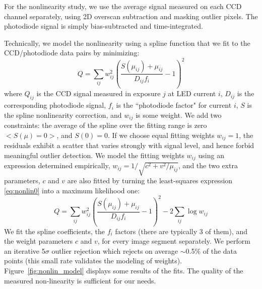 For the nonlinearity study, we use the average signal measured on each CCD channel separately, using 2D overscan subtraction and masking outlier pixels. The photodiode signal is simply bias-subtracted and time-integrated. 

Technically, we model the nonlinearity using a spline function that we fit to the CCD/photodiode data pairs by minimizing:
\begin{equation}
Q = \sum_{ij} w_{ij}^2 \left( \frac{ S(\mu_{ij}) +\mu_{ij}  }{D_{ij} f_i} -1 \right)^2
\label{eq:nonlin0}
\end{equation}
where $Q_{ij}$ is the CCD signal measured in exposure $j$ at LED current $i$,
$D_{ij}$ is the corresponding photodiode signal, $f_i$ is the ``photodiode factor" for current $i$, $S$ is the spline nonlinearity correction, and $w_{ij}$ is some weight. We add two constraints: the average of the spline over the fitting range is zero $<S(\mu)=0>$, and $S(0) = 0$. If we choose equal fitting weights $w_{ij}=1$, the residuals exhibit a scatter that varies strongly with signal level, and hence forbid meaningful outlier detection. We model the fitting weights $w_{ij}$ using an expression determined empirically, $w_{ij} = 1/\sqrt{c^2+v^2/\mu_{ij}}$, and the two extra parameters, $c$ and $v$ are also fitted by turning the least-squares expression \ref{eq:nonlin0} into a maximum likelihood one:
\begin{equation}
Q = \sum_{ij} w_{ij}^2 \left( \frac{ S(\mu_{ij}) +\mu_{ij}  }{D_{ij} f_i} -1 \right)^2 - 2 \sum_{ij} \log w_{ij}
\label{eq:nonlin1}
\end{equation}
We fit the spline coefficients, the $f_i$ factors (there are typically 3 of them), and the weight parameters $c$ and $v$, for every image segment separately. We perform an iterative 5$\sigma$ outlier rejection which rejects on average $\sim $0.5\% of the data points (this small rate validates the modeling of weights). Figure~\ref{fig:nonlin_model} displays some results of the fits. The quality of the measured non-linearity is sufficient for our needs.   




